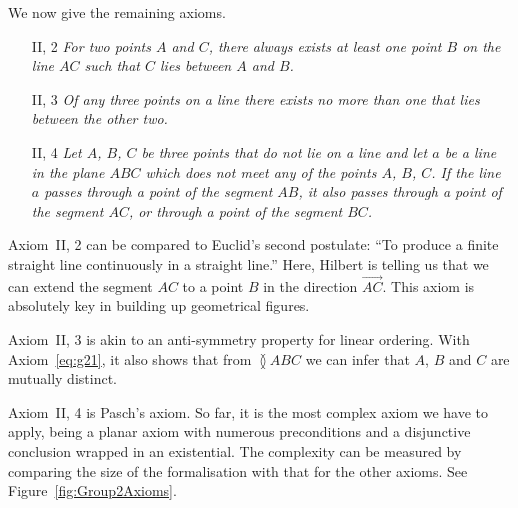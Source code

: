We now give the remaining axioms.
\begin{enumerate}
  \item[II, 2] \emph{For two points $A$ and $C$, there always exists at least one point $B$ on the line $AC$ such that $C$ lies between $A$ and $B$.}
  \item[II, 3] \emph{Of any three points on a line there exists no more than one that lies between the other two.}
  \item[II, 4] \emph{Let $A$, $B$, $C$ be three points that do not lie on a line and let $a$ be a line in the plane $ABC$ which does not meet any of the points $A$, $B$, $C$. If the line $a$ passes through a point of the segment $AB$, it also passes through a point of the segment $AC$, or through a point of the segment $BC$.}
\end{enumerate}

Axiom~II, 2 can be compared to Euclid's second postulate: ``To produce a finite straight line continuously in a straight line.'' Here, Hilbert is telling us that we can extend the segment $AC$ to a point $B$ in the direction $\overrightarrow{AC}$. This axiom is absolutely key in building up geometrical figures.

Axiom~II, 3 is akin to an anti-symmetry property for linear ordering. With Axiom~\ref{eq:g21}, it also shows that from $\between{A}{B}{C}$ we can infer that $A$, $B$ and $C$ are mutually distinct.

Axiom~II, 4 is Pasch's axiom. So far, it is the most complex axiom we have to apply, being a planar axiom with numerous preconditions and a disjunctive conclusion wrapped in an existential. The complexity can be measured by comparing the size of the formalisation with that for the other axioms. See Figure~\ref{fig:Group2Axioms}.

